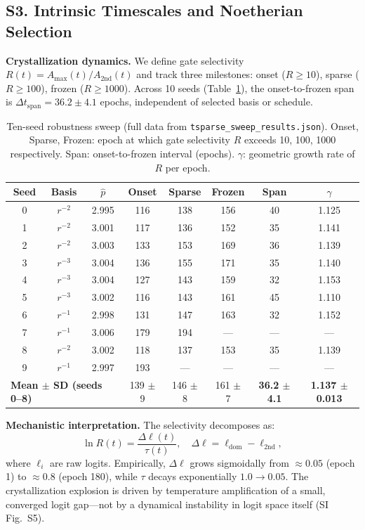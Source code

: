\documentclass[9pt,twocolumn,twoside]{pnas-new}
\begin{document}
\subsection*{S3. Intrinsic Timescales and Noetherian Selection}
\textbf{Crystallization dynamics.} We define gate selectivity $R(t) = A_{\max}(t) / A_{\text{2nd}}(t)$ and track three milestones: onset ($R \geq 10$), sparse ($R \geq 100$), frozen ($R \geq 1000$). Across 10 seeds (Table~\ref{tab:tsparse-si}), the onset-to-frozen span is $\Delta t_{\text{span}} = 36.2 \pm 4.1$ epochs, independent of selected basis or schedule.

\begin{table}[!ht]
\centering
\caption{Ten-seed robustness sweep (full data from \texttt{tsparse\_sweep\_results.json}). Onset, Sparse, Frozen: epoch at which gate selectivity $R$ exceeds 10, 100, 1000 respectively. Span: onset-to-frozen interval (epochs). $\gamma$: geometric growth rate of $R$ per epoch.}
\label{tab:tsparse-si}
\footnotesize
\begin{tabular}{cccccccc}
\hline
Seed & Basis & $\hat{p}$ & Onset & Sparse & Frozen & Span & $\gamma$ \\
\hline
0 & $r^{-2}$ & 2.995 & 116 & 138 & 156 & 40 & 1.125 \\
1 & $r^{-2}$ & 3.001 & 117 & 136 & 152 & 35 & 1.141 \\
2 & $r^{-2}$ & 3.003 & 133 & 153 & 169 & 36 & 1.139 \\
3 & $r^{-3}$ & 3.004 & 136 & 155 & 171 & 35 & 1.140 \\
4 & $r^{-3}$ & 3.004 & 127 & 143 & 159 & 32 & 1.153 \\
5 & $r^{-3}$ & 3.002 & 116 & 143 & 161 & 45 & 1.110 \\
6 & $r^{-1}$ & 2.998 & 131 & 147 & 163 & 32 & 1.152 \\
7 & $r^{-1}$ & 3.006 & 179 & 194 & --- & --- & --- \\
8 & $r^{-2}$ & 3.002 & 118 & 137 & 153 & 35 & 1.139 \\
9 & $r^{-1}$ & 2.997 & 193 & --- & --- & --- & --- \\
\hline
\multicolumn{3}{l}{\textbf{Mean $\pm$ SD (seeds 0--8)}} & 139 $\pm$ 9 & 146 $\pm$ 8 & 161 $\pm$ 7 & \textbf{36.2 $\pm$ 4.1} & \textbf{1.137 $\pm$ 0.013} \\
\hline
\end{tabular}
\end{table}

\textbf{Mechanistic interpretation.} The selectivity decomposes as:
\begin{equation}
\ln R(t) = \frac{\Delta \ell(t)}{\tau(t)}, \quad \Delta \ell = \ell_{\text{dom}} - \ell_{\text{2nd}},
\end{equation}
where $\ell_i$ are raw logits. Empirically, $\Delta \ell$ grows sigmoidally from $\approx 0.05$ (epoch 1) to $\approx 0.8$ (epoch 180), while $\tau$ decays exponentially $1.0 \to 0.05$. The crystallization explosion is driven by temperature amplification of a small, converged logit gap---not by a dynamical instability in logit space itself (SI Fig.~S5).
\end{document}
